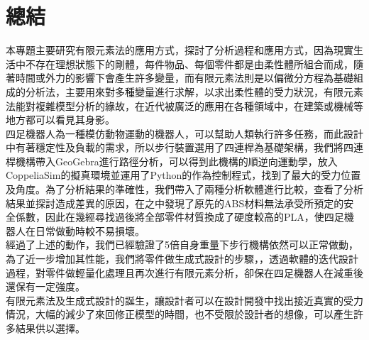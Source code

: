 \chapter{總結}
本專題主要研究有限元素法的應用方式，探討了分析過程和應用方式，因為現實生活中不存在理想狀態下的剛體，每件物品、每個零件都是由柔性體所組合而成，隨著時間或外力的影響下會產生許多變量，而有限元素法則是以偏微分方程為基礎組成的分析法，主要用來對多種變量進行求解，以求出柔性體的受力狀況，有限元素法能對複雜模型分析的緣故，在近代被廣泛的應用在各種領域中，在建築或機械等地方都可以看見其身影。\\

四足機器人為一種模仿動物運動的機器人，可以幫助人類執行許多任務，而此設計中有著穩定性及負載的需求，所以步行裝置選用了四連桿為基礎架構，我們將四連桿機構帶入GeoGebra進行路徑分析，可以得到此機構的順逆向運動學，放入CoppeliaSim的擬真環境並運用了Python的作為控制程式，找到了最大的受力位置及角度。為了分析結果的準確性，我們帶入了兩種分析軟體進行比較，查看了分析結果並探討造成差異的原因，在之中發現了原先的ABS材料無法承受所預定的安全係數，因此在幾經尋找過後將全部零件材質換成了硬度較高的PLA，使四足機器人在日常做動時較不易損壞。\\

經過了上述的動作，我們已經驗證了5倍自身重量下步行機構依然可以正常做動，為了近一步增加其性能，我們將零件做生成式設計的步驟，，透過軟體的迭代設計過程，對零件做輕量化處理且再次進行有限元素分析，卻保在四足機器人在減重後還保有一定強度。\\

有限元素法及生成式設計的誕生，讓設計者可以在設計開發中找出接近真實的受力情況，大幅的減少了來回修正模型的時間，也不受限於設計者的想像，可以產生許多結果供以選擇。\
\newpage


